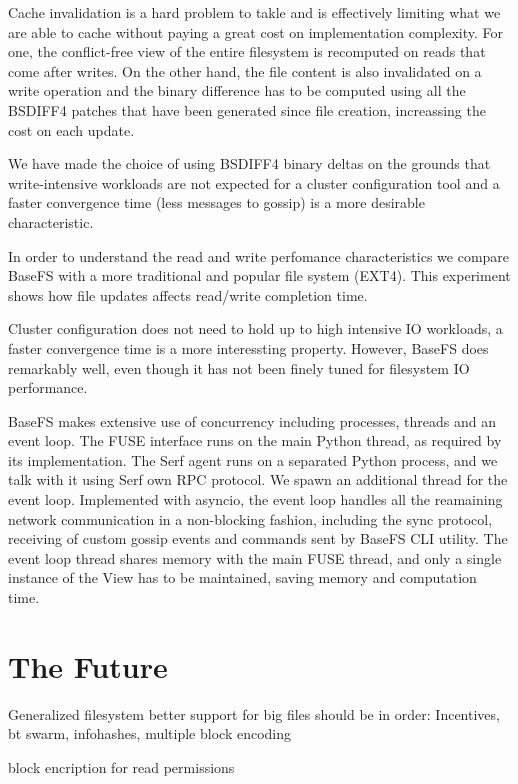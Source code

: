 \documentclass{sig-alternate}
\begin{document}
Cache invalidation is a hard problem to takle and is effectively limiting what we are able to cache without paying a great cost on implementation complexity. For one, the conflict-free view of the entire filesystem is recomputed on reads that come after writes. On the other hand, the file content is also invalidated on a write operation and the binary difference has to be computed using all the BSDIFF4 patches that have been generated since file creation, increassing the cost on each update.

We have made the choice of using BSDIFF4 binary deltas on the grounds that write-intensive workloads are not expected for a cluster configuration tool and a faster convergence time (less messages to gossip) is a more desirable characteristic.

In order to understand the read and write perfomance characteristics we compare BaseFS with a more traditional and popular file system (EXT4). This experiment shows how file updates affects read/write completion time.

Cluster configuration does not need to hold up to high intensive IO workloads, a faster convergence time is a more interessting property. However, BaseFS does remarkably well, even though it has not been finely tuned for filesystem IO performance.

BaseFS makes extensive use of concurrency including processes, threads and an event loop. The FUSE interface runs on the main Python thread, as required by its implementation. The Serf agent runs on a separated Python process, and we talk with it using Serf own RPC protocol. We spawn an additional thread for the event loop. Implemented with asyncio, the event loop handles all the reamaining network communication in a non-blocking fashion, including the sync protocol, receiving of custom gossip events and commands sent by BaseFS CLI utility. The event loop thread shares memory with the main FUSE thread, and only a single instance of the View has to be maintained, saving memory and computation time.



\section{The Future}

Generalized filesystem better support for big files should be in order: Incentives, bt swarm, infohashes, multiple block encoding

block encription for read permissions
\end{document}
